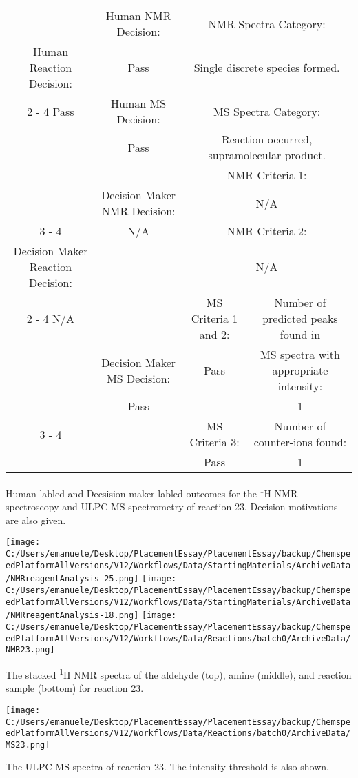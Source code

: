 \documentclass{article}%
\begin{document}
\begin{Decision Table}[H]%
\begin{tabular}{|c|c|c|c|}%
\hline%
&Human NMR Decision:&\multicolumn{2}{|c|}{NMR Spectra Category:}\\%
Human Reaction Decision:&Pass&\multicolumn{2}{|c|}{Single discrete species formed.}\\%
\cline{2%
-%
4}%
Pass&Human MS Decision:&\multicolumn{2}{|c|}{MS Spectra Category:}\\%
&Pass&\multicolumn{2}{|c|}{Reaction occurred, supramolecular product.}\\%
\hline%
&&\multicolumn{2}{|c|}{NMR Criteria 1:}\\%
&Decision Maker NMR Decision:&\multicolumn{2}{|c|}{N/A}\\%
\cline{3%
-%
4}%
&N/A&\multicolumn{2}{|c|}{NMR Criteria 2:}\\%
Decision Maker Reaction Decision:&&\multicolumn{2}{|c|}{N/A}\\%
\cline{2%
-%
4}%
N/A&&MS Criteria 1 and 2:&Number of predicted peaks found in\\%
&Decision Maker MS Decision:&Pass&MS spectra with appropriate intensity:\\%
&Pass&&1\\%
\cline{3%
-%
4}%
&&MS Criteria 3:&Number of counter{-}ions found:\\%
&&Pass&1\\%
\hline%
\end{tabular}%
\caption{Human labled and Decsision maker labled outcomes for the \textsuperscript{1}H NMR spectroscopy and ULPC-MS spectrometry of reaction 23. Decision motivations are also given.}%
\end{Decision Table}%
\begin{NMR Spectra}[H]%
\begin{center}%
\texttt{[image: C:/Users/emanuele/Desktop/PlacementEssay/PlacementEssay/backup/ChemspeedPlatformAllVersions/V12/Workflows/Data/StartingMaterials/ArchiveData/NMRreagentAnalysis-25.png]}\hfill%
\texttt{[image: C:/Users/emanuele/Desktop/PlacementEssay/PlacementEssay/backup/ChemspeedPlatformAllVersions/V12/Workflows/Data/StartingMaterials/ArchiveData/NMRreagentAnalysis-18.png]}\hfill%
\texttt{[image: C:/Users/emanuele/Desktop/PlacementEssay/PlacementEssay/backup/ChemspeedPlatformAllVersions/V12/Workflows/Data/Reactions/batch0/ArchiveData/NMR23.png]}\hfill%
\end{center}%
\caption{The stacked \textsuperscript{1}H NMR spectra of the aldehyde (top), amine (middle), and reaction sample (bottom) for reaction 23.}%
\end{NMR Spectra}%
\begin{MS Spectra}[H]%
\begin{center}%
\texttt{[image: C:/Users/emanuele/Desktop/PlacementEssay/PlacementEssay/backup/ChemspeedPlatformAllVersions/V12/Workflows/Data/Reactions/batch0/ArchiveData/MS23.png]}\hfill%
\end{center}%
\caption{The ULPC-MS spectra of reaction 23. The intensity threshold is also shown.}%
\end{MS Spectra}%
\end{document}
